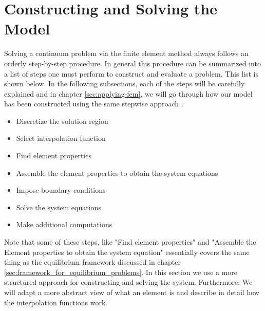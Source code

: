 \section{Constructing and Solving the Model}
\label{sec:using-the-FEM}
Solving a continuum problem via the finite element method
always follows an orderly step-by-step procedure. In general this procedure
can be summarized into a list of steps one must perform to construct
and evaluate a problem. This list is shown below.
In the following subsections, each of the steps will be carefully
explained and in chapter \vref{sec:applying-fem}, we will go through
how our model has been constructed using the same stepwise approach
.


\begin{itemize}
\item Discretize the solution region
\item Select interpolation function
\item Find element properties
\item Assemble the element properties to obtain the system equations
\item Impose boundary conditions
\item Solve the system equations
\item Make additional computations
\end{itemize}

Note that some of these steps, like "Find element properties" and
"Assemble the Element properties to obtain the system equation"
essentially covers the same thing as the equilibrium framework discussed
in chapter \vref{sec:framework_for_equilibrium_problems}. In this
section we use a more structured approach for constructing and solving
the system. Furthermore: We will adapt a more abstract view of what an
element is and describe in detail how the interpolation functions
work.

